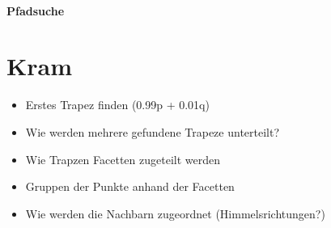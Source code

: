\documentclass[11pt, a4paper]{article}
\begin{document}
\paragraph{Pfadsuche}

\section{Kram}

\begin{itemize}
\item Erstes Trapez finden (0.99p + 0.01q)
\item Wie werden mehrere gefundene Trapeze unterteilt?
\item Wie Trapzen Facetten zugeteilt werden
\item Gruppen der Punkte anhand der Facetten
\item Wie werden die Nachbarn zugeordnet (Himmelsrichtungen?)
\end{itemize}
\end{document}
